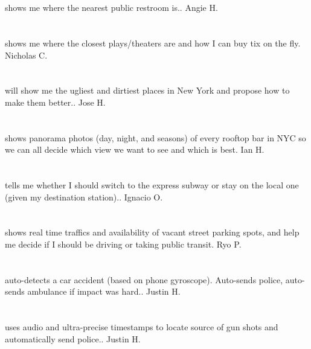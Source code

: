\section{}shows me where the nearest public restroom is.. Angie H.
\section{}shows me where the closest plays/theaters are and how I can buy tix on the fly. Nicholas C.
\section{}will show me  the ugliest and dirtiest  places in New York and propose how to make them better.. Jose H.
\section{}shows panorama photos (day,  night,  and seasons) of every rooftop bar in NYC so we can all decide which view we want to see and which is best. Ian H.
\section{}tells me whether I should switch to the express subway or stay on the local one (given my destination station).. Ignacio O.
\section{}shows real time traffics and availability of vacant street parking spots,  and help me decide if I should be driving or taking public transit. Ryo P.
\section{} auto-detects a car accident (based on phone gyroscope). Auto-sends police,  auto-sends ambulance if impact was hard.. Justin H.
\section{}uses audio and ultra-precise timestamps to locate source of gun shots and automatically send police.. Justin H.
